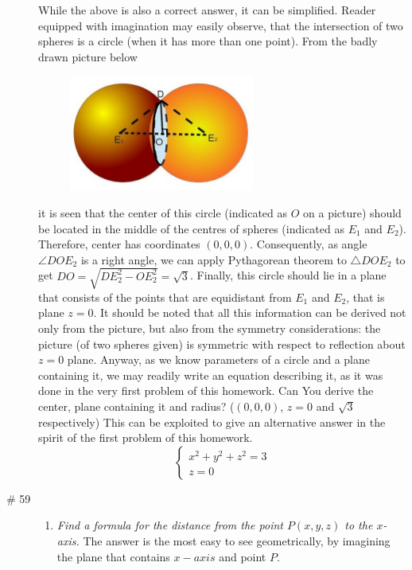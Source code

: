 \documentclass[8pt]{article} %
\begin{document}
\begin{description}
{While the above is also a correct answer, it can be simplified. 
Reader equipped with imagination may easily observe, that the intersection of two spheres is a circle (when it has more than one point).
From the badly drawn picture below
\begin{figure}[H]
\centering
\includegraphics[width=0.6\textwidth]{fin_hw1_spheres}
\end{figure}
it is seen that the center of this circle (indicated as $O$ on a picture) should be located in the middle of the centres of spheres
(indicated as $E_1$ and $E_2$). Therefore, center has coordinates $(0,0,0)$. Consequently, as angle $\angle DOE_2$ is a right angle,
we can apply Pythagorean theorem to $\triangle DOE_2$ to get $DO=\sqrt{DE_2^2-OE_2^2}=\sqrt{3}$. Finally, this circle should lie in a plane that
consists of the points that are equidistant from $E_1$ and $E_2$, that is plane $z=0$. It should be noted that all this information can be derived
not only from the picture, but also from the symmetry considerations: the picture (of two spheres given) is symmetric with respect to reflection
about $z=0$ plane. Anyway, as we know parameters of a circle and a plane containing it, we may readily write an equation describing it, as it
was done in the very first problem of this homework.
Can You derive the 
center, plane containing it and radius? ($(0,0,0)$, $z=0$ and $\sqrt{3}$ respectively) This can be exploited to
 give an alternative answer in the spirit of the first problem of this homework.
\[\begin{cases}x^2+y^2+z^2=3\\z=0\end{cases}\]
}
\item[\# 59]{\begin{enumerate}[label=\bfseries\alph*.]
\item{\textit{Find a formula for the distance from the point $P(x,y,z)$ to the $x$-axis.}
The answer is the most easy to see geometrically, by imagining the plane that contains $x-axis$ and point $P$.
\begin{figure}[H]

\end{figure}}
\end{enumerate}}
\end{description}
\end{document}
